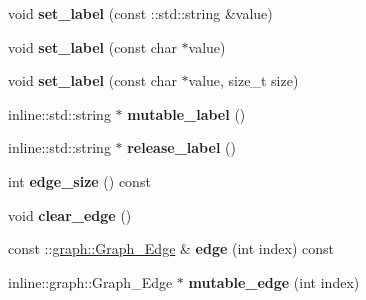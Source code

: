 \begin{DoxyCompactItemize}
\item 
\hypertarget{classgraph_1_1Graph__Node_ac7d3363065ac3e53045612da423e8063}{
void {\bfseries set\_\-label} (const ::std::string \&value)}
\label{classgraph_1_1Graph__Node_ac7d3363065ac3e53045612da423e8063}

\item 
\hypertarget{classgraph_1_1Graph__Node_a15d313094babc84b96727fc0f3c1d8ec}{
void {\bfseries set\_\-label} (const char $\ast$value)}
\label{classgraph_1_1Graph__Node_a15d313094babc84b96727fc0f3c1d8ec}

\item 
\hypertarget{classgraph_1_1Graph__Node_a1919f6fa3da8bfd42a347bf6600ce8b8}{
void {\bfseries set\_\-label} (const char $\ast$value, size\_\-t size)}
\label{classgraph_1_1Graph__Node_a1919f6fa3da8bfd42a347bf6600ce8b8}

\item 
\hypertarget{classgraph_1_1Graph__Node_a88bb3c0873b401bc7057b829b141ee40}{
inline::std::string $\ast$ {\bfseries mutable\_\-label} ()}
\label{classgraph_1_1Graph__Node_a88bb3c0873b401bc7057b829b141ee40}

\item 
\hypertarget{classgraph_1_1Graph__Node_a44b318000f10362c94dd75f2d6dd340f}{
inline::std::string $\ast$ {\bfseries release\_\-label} ()}
\label{classgraph_1_1Graph__Node_a44b318000f10362c94dd75f2d6dd340f}

\item 
\hypertarget{classgraph_1_1Graph__Node_aa33c2e20c45055a5f5c64fde8f475b12}{
int {\bfseries edge\_\-size} () const }
\label{classgraph_1_1Graph__Node_aa33c2e20c45055a5f5c64fde8f475b12}

\item 
\hypertarget{classgraph_1_1Graph__Node_a71d1bf9742cb25c8c902a1e04f9c5117}{
void {\bfseries clear\_\-edge} ()}
\label{classgraph_1_1Graph__Node_a71d1bf9742cb25c8c902a1e04f9c5117}

\item 
\hypertarget{classgraph_1_1Graph__Node_a22a50a45912b9092b9226607a35c1224}{
const ::\hyperlink{classgraph_1_1Graph__Edge}{graph::Graph\_\-Edge} \& {\bfseries edge} (int index) const }
\label{classgraph_1_1Graph__Node_a22a50a45912b9092b9226607a35c1224}

\item 
\hypertarget{classgraph_1_1Graph__Node_ab67ca8df7129110d5e50550ada39ee48}{
inline::graph::Graph\_\-Edge $\ast$ {\bfseries mutable\_\-edge} (int index)}
\label{classgraph_1_1Graph__Node_ab67ca8df7129110d5e50550ada39ee48}


\end{DoxyCompactItemize}
